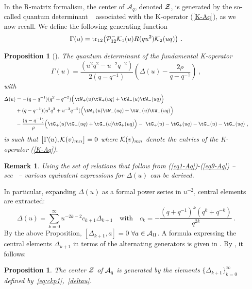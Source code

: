 \documentclass[11pt]{amsart}
\numberwithin{equation}{section}
\newtheorem{prop}[thm]{Proposition}
\newtheorem{rem}[thm]{Remark}
\numberwithin{equation}{section}
\begin{document}
\begin{appendix}
In the R-matrix formalism, the center of $\mathcal{A}_q$, denoted $\cal Z$, is generated by the so-called quantum determinant ~\cite{Skly88} associated with the K-operator (\ref{K-Aq}), as we now recall. We define the following generating function
	\begin{equation}
		\Gamma(u)=\normalfont{\text{tr}}_{12}\big({\cal P}^{-}_{12} {\cal K}_1(u)  R(qu^2)  {\cal K}_2(u q) \big) \ .  \label{gammaform}
	\end{equation}

	\begin{prop}[\cite{BasBel}]  The quantum determinant of  the fundamental K-operator
		\begin{equation}
			\Gamma(u)=
			\frac{(u^2q^2-u^{-2}q^{-2})}{2(q-q^{-1})}\left( \Delta(u) - \frac{2\rho}{q-q^{-1}}\right) \ ,\label{gamma}
		\end{equation}
		with
		\begin{align} 
			\Delta(u)&= -(q-q^{-1})(q^2+q^{-2})\Big(\tW_+(u)\tW_+(uq) + \tW_-(u)\tW_-(uq)\Big) \label{deltau}  \\ \nonumber
			&+(q-q^{-1})(u^2q^2+u^{-2}q^{-2})\Big(\tW_+(u)\tW_-(uq) + \tW_-(u)\tW_+(uq)\Big)\\ 
			&- \frac{(q-q^{-1})}{\rho} \Big(\tG_+(u)\tG_-(uq) + \tG_-(u)\tG_+(uq)\Big) - \ \tG_+(u) - \tG_+(uq) - \tG_-(u) - \tG_-(uq)  \  ,\nonumber
		\end{align}
		is  such that  $\big[\Gamma(u),{\cal K}(v)_{mn}\big]=0$ where ${\cal K}(v)_{mn}$ denote the entries of the K-operator (\ref{K-Aq}). 
	\end{prop}
\begin{rem}
	Using the set of relations  that follow from (\ref{eq1-Aq})-(\ref{eq9-Aq}) -- see~\cite[Lem.\,B.1]{LBG} -- various equivalent expressions for $\Delta(u)$ can be derived. 
\end{rem}
	
In particular, expanding $\Delta(u)$ as a formal power series  in  $u^{-2}$, central elements are extracted:
\begin{equation}
	\Delta(u)  = \displaystyle{\sum_{k=0}^\infty}  u^{-2k-2} c_{k+1} \Delta_{k+1} \quad \mbox{with} \quad  c_{k} = - \frac{ (q+q^{-1})^{k} (q^{k} + q^{-k})} {q^{2k}} \ . \label{eq:ckp1}
\end{equation}
By the above Proposition, $[\Delta_{k+1},a]=0$ $\forall a\in {\cal A_q}$.
A formula expressing the central elements $\Delta_{k+1}$ in terms of the alternating generators is given in \cite[Lem.\,2.1]{BasBel}. 
By \cite[Thm.\,10.2(i)]{Ter21}, it follows:
%
\begin{prop}\label{DefZ} The center ${\cal Z}$ of ${\cal A}_q$ is generated by the elements $\{\Delta_{k+1}\}_{k=0}^{\infty}$ defined by~\eqref{eq:ckp1},~\eqref{deltau}.
\end{prop}


\end{appendix}
\end{document}
